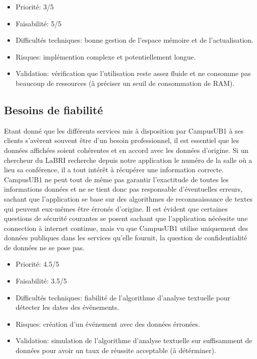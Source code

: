 \documentclass [pdftex,12pt] {report}
\begin{document}
\begin{itemize}
\renewcommand{\labelitemi}{$\bullet$}
\item Priorité: 3/5
\item Faisabilité: 5/5
\item Difficultés techniques: bonne gestion de l'espace mémoire et de l'actualisation.
\item Risques: implémention complexe et potentiellement longue.
\item Validation: vérification que l'utilisation reste assez fluide et ne consomme pas beaucoup de ressources (à préciser un seuil de consommation de RAM).
\end{itemize}  

\subsection{Besoins de fiabilité}
Etant donné que les différents services mis à disposition par CampusUB1 à ses clients s'avèrent souvent être d'un besoin professionnel, il est essentiel que les données affichées soient cohérentes et en accord avec les données d'origine. Si un chercheur du LaBRI recherche depuis notre application le numéro de la salle où a lieu sa conférence, il a tout intérêt à récupérer une information correcte. CampusUB1 ne peut tout de même pas garantir l'exactitude de toutes les informations données et ne se tient donc pas responsable d'éventuelles erreurs, sachant que l'application se base sur des algorithmes de reconnsaissance de textes qui peuvent eux-mêmes être érronés d'origine. Il est évident que certaines questions de sécurité courantes se posent sachant que l'application nécéssite une connection à internet continue, mais vu que CampusUB1 utilise uniquement des données publiques dans les services qu'elle fournit, la question de confidentialité de données ne se pose pas.

\begin{itemize}
\renewcommand{\labelitemi}{$\bullet$}
\item Priorité: 4.5/5
\item Faisabilité: 3.5/5
\item Difficultés techniques: fiabilité de l'algorithme d'analyse textuelle pour détecter les dates des événements.
\item Risques: création d'un événement avec des données érronées.
\item Validation: simulation de l'algorithme d'analyse textuelle sur suffisamment de données pour avoir un taux de réussite acceptable (à détérminer).
\end{itemize}  
\end{document}
